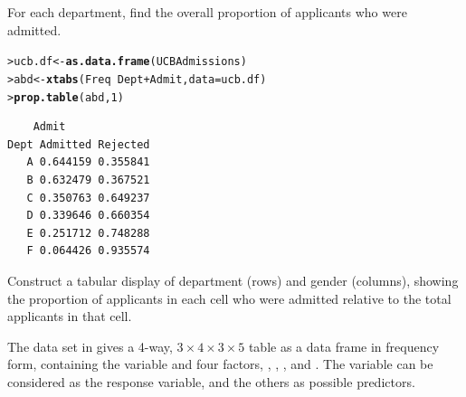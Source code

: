 \documentclass[11pt]{report}\usepackage[]{graphicx}\usepackage[]{color}
\makeatletter
\newcommand{\hlnum}[1]{\textcolor[rgb]{0.686,0.059,0.569}{#1}}%
\newcommand{\hlopt}[1]{\textcolor[rgb]{0,0,0}{#1}}%
\newcommand{\hlstd}[1]{\textcolor[rgb]{0.345,0.345,0.345}{#1}}%
\newcommand{\hlkwb}[1]{\textcolor[rgb]{0.69,0.353,0.396}{#1}}%
\newcommand{\hlkwc}[1]{\textcolor[rgb]{0.333,0.667,0.333}{#1}}%
\newcommand{\hlkwd}[1]{\textcolor[rgb]{0.737,0.353,0.396}{\textbf{#1}}}%
\newenvironment{kframe}{%
 \def\at@end@of@kframe{}%
 \ifinner\ifhmode%
  \def\at@end@of@kframe{\end{minipage}}%
  \begin{minipage}{\columnwidth}%
 \fi\fi%
 \def\FrameCommand##1{\hskip\@totalleftmargin \hskip-\fboxsep
 \colorbox{shadecolor}{##1}\hskip-\fboxsep
     \hskip-\linewidth \hskip-\@totalleftmargin \hskip\columnwidth}%
 \MakeFramed {\advance\hsize-\width
   \@totalleftmargin\z@ \linewidth\hsize
   \@setminipage}}%
 {\par\unskip\endMakeFramed%
 \at@end@of@kframe}
\newenvironment{knitrout}{}{} %
\renewenvironment{knitrout}{\small\renewcommand{\baselinestretch}{.85}}{} %
\makeatother
\begin{document}
\begin{Exercises}
\begin{enumerate*}
    \item For each department, find the overall proportion of applicants who were admitted.
    \begin{ans}
\begin{knitrout}
\color{fgcolor}\begin{kframe}
\begin{alltt}
\hlstd{> }\hlstd{ucb.df} \hlkwb{<-} \hlkwd{as.data.frame}\hlstd{(UCBAdmissions)}
\hlstd{> }\hlstd{abd} \hlkwb{<-} \hlkwd{xtabs}\hlstd{(Freq} \hlopt{~} \hlstd{Dept} \hlopt{+} \hlstd{Admit,} \hlkwc{data}\hlstd{=ucb.df)}
\hlstd{> }\hlkwd{prop.table}\hlstd{(abd,} \hlnum{1}\hlstd{)}
\end{alltt}
\begin{verbatim}
    Admit
Dept Admitted Rejected
   A 0.644159 0.355841
   B 0.632479 0.367521
   C 0.350763 0.649237
   D 0.339646 0.660354
   E 0.251712 0.748288
   F 0.064426 0.935574
\end{verbatim}
\end{kframe}
\end{knitrout}
    \end{ans}
        
    \item Construct a tabular display of department (rows) and gender (columns), showing
    the proportion of applicants in each cell who were admitted
    relative to the total applicants in that cell.
    \begin{ans}
    \end{ans}
        
  \end{enumerate*}

\exercise The data set  in  
gives a 4-way, $3 \times 4 \times 3 \times 5$ 
table as a data frame in
frequency form, containing the variable  and four factors,
,
,
, and
.  The variable  can be considered as the
response variable, and the others as possible predictors.


\end{Exercises}
\end{document}
